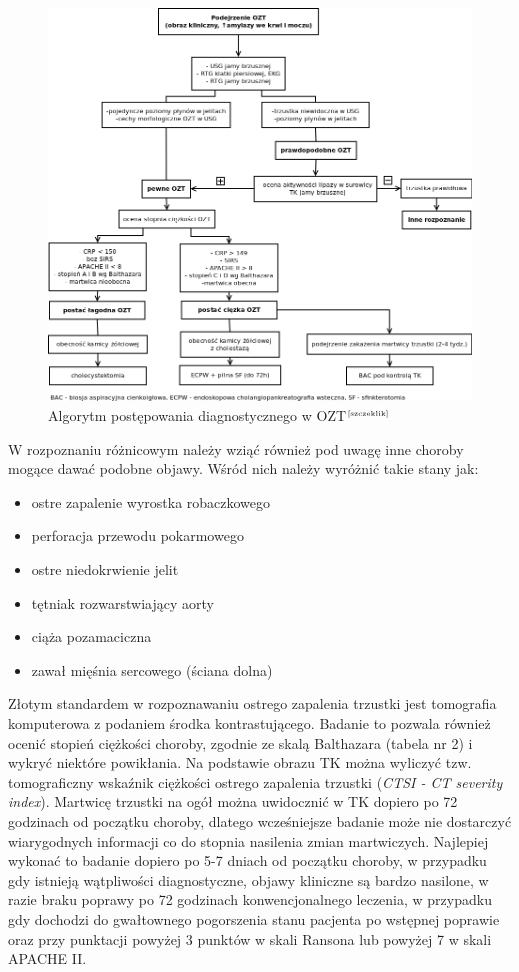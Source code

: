 \documentclass[a4paper, 12pt]{report}
\newcommand\cyt[1]{$^{\tiny{\cite{#1}}}$}
\begin{document}
\begin{figure}[!h]
\centering
\includegraphics[scale=0.4]{pan-diag}
\caption{Algorytm postępowania diagnostycznego w OZT\cyt{szczeklik}}
\end{figure}

W rozpoznaniu różnicowym należy wziąć również pod uwagę inne choroby
mogące dawać podobne objawy. Wśród nich należy wyróżnić takie stany jak: 
\begin{itemize} 
\setlength{\itemsep}{0cm}
\setlength{\parskip}{0cm}
\item ostre zapalenie wyrostka robaczkowego 
\item perforacja przewodu pokarmowego
\item ostre niedokrwienie jelit
\item tętniak rozwarstwiający aorty
\item ciąża pozamaciczna
\item zawał mięśnia sercowego (ściana dolna)
\end{itemize}

Złotym standardem w rozpoznawaniu ostrego zapalenia trzustki jest
tomografia komputerowa z podaniem środka kontrastującego. Badanie to
pozwala również ocenić stopień ciężkości choroby, zgodnie ze skalą
Balthazara (tabela nr 2) i wykryć niektóre powikłania. Na podstawie
obrazu TK można wyliczyć tzw. tomograficzny wskaźnik ciężkości ostrego
zapalenia trzustki (\textsl{CTSI - CT severity index}). Martwicę
trzustki na ogół można uwidocznić w TK dopiero po 72 godzinach od
początku choroby, dlatego wcześniejsze badanie może nie dostarczyć
wiarygodnych informacji co do stopnia nasilenia zmian
martwiczych. Najlepiej wykonać to badanie dopiero po 5-7 dniach od
początku choroby, w przypadku gdy istnieją wątpliwości diagnostyczne,
objawy kliniczne są bardzo nasilone, w razie braku poprawy po 72
godzinach konwencjonalnego leczenia, w przypadku gdy dochodzi do
gwałtownego pogorszenia stanu pacjenta po wstępnej poprawie oraz przy
punktacji powyżej 3 punktów w skali Ransona lub powyżej 7 w skali
APACHE II.
\end{document}
